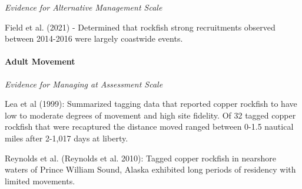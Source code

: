 \documentclass[11pt,
  english,
  a4paper,
]{article}
\begin{document}
\leavevmode\tagmcend\tagstructend\par


\emph{Evidence for Alternative Management Scale}

\leavevmode\tagmcend\tagstructend\par


Field et al. {(2021)\leavevmode\tagmcend\tagstructend} - Determined that rockfish strong recruitments observed between 2014-2016 were largely coastwide events.

\leavevmode\tagmcend\tagstructend\par


\hypertarget{adult-movement}{%
\paragraph{Adult Movement}\label{adult-movement}}

\leavevmode\tagmcend\tagstructend


\emph{Evidence for Managing at Assessment Scale}

\leavevmode\tagmcend\tagstructend\par


Lea et al {(1999)\leavevmode\tagmcend\tagstructend}: Summarized tagging data that reported copper rockfish to have low to moderate degrees of movement and high site fidelity. Of 32 tagged copper rockfish that were recaptured the distance moved ranged between 0-1.5 nautical miles after 2-1,017 days at liberty.

\leavevmode\tagmcend\tagstructend\par


Reynolds et al. {(Reynolds et al. 2010)\leavevmode\tagmcend\tagstructend}: Tagged copper rockfish in nearshore waters of Prince William Sound, Alaska exhibited long periods of residency with limited movements.

\leavevmode\tagmcend\tagstructend\par
\end{document}
